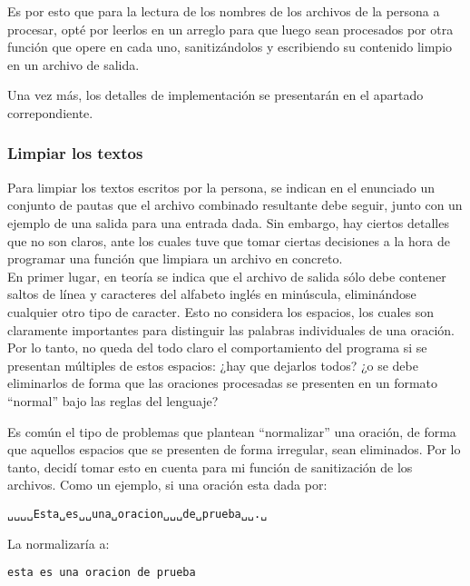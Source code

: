 \documentclass[a4paper]{article}
\begin{document}
Es por esto que para la lectura de los nombres de los archivos de la persona a procesar, opté por leerlos en un arreglo para que luego sean procesados por otra función que opere en cada uno, sanitizándolos y escribiendo su contenido limpio en un archivo de salida.

Una vez más, los detalles de implementación se presentarán en el apartado correpondiente. %

\subsubsection{Limpiar los textos}

Para limpiar los textos escritos por la persona, se indican en el enunciado un conjunto de pautas que el archivo combinado resultante debe seguir, junto con un ejemplo de una salida para una entrada dada. Sin embargo, hay ciertos detalles que no son claros, ante los cuales tuve que tomar ciertas decisiones a la hora de programar una función que limpiara un archivo en concreto. \\

En primer lugar, en teoría se indica que el archivo de salida sólo debe contener saltos de línea y caracteres del alfabeto inglés en minúscula, eliminándose cualquier otro tipo de caracter. Esto no considera los espacios, los cuales son claramente importantes para distinguir las palabras individuales de una oración. Por lo tanto, no queda del todo claro el comportamiento del programa si se presentan múltiples de estos espacios: ¿hay que dejarlos todos? ¿o se debe eliminarlos de forma que las oraciones procesadas se presenten en un formato ``normal'' bajo las reglas del lenguaje?

Es común el tipo de problemas que plantean ``normalizar'' una oración, de forma que aquellos espacios que se presenten de forma irregular, sean eliminados. Por lo tanto, decidí tomar esto en cuenta para mi función de sanitización de los archivos. Como un ejemplo, si una oración esta dada por:

\begin{tcolorbox}
    \texttt{␣␣␣␣Esta␣es␣␣una␣oracion␣␣␣de␣prueba␣␣.␣}
\end{tcolorbox}

\noindent{}La normalizaría a:

\begin{tcolorbox}
    \texttt{esta es una oracion de prueba}
\end{tcolorbox}

\vspace{10pt}
\end{document}
